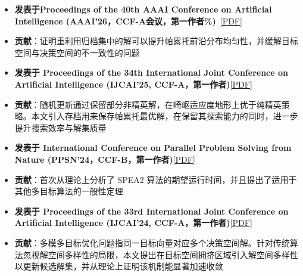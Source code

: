 \documentclass{resume}
\begin{document}
\begin{itemize}
    \item {\textbf{发表于Proceedings of the 40th AAAI Conference on Artificial Intelligence (AAAI'26，CCF-A会议，第一作者\%)}\ \href{https://ojs.aaai.org/index.php/AAAI/article/view/41045}{[PDF]}}
    \item {\textbf{贡献}}：证明重利用归档集中的解可以提升帕累托前沿分布均匀性，并缓解目标空间与决策空间的不一致性的问题
\end{itemize}
\begin{itemize}
    \item {\textbf{发表于 Proceedings of the 34th International Joint Conference on Artificial Intelligence (IJCAI'25, CCF-A，第一作者)}}\href{https://www.ijcai.org/proceedings/2025/0992.pdf}{[PDF]}
    \item {\textbf{贡献}：随机更新通过保留部分非精英解，在崎岖适应度地形上优于纯精英策略。本文引入存档用来保存帕累托最优解，在保留其探索能力的同时，进一步提升搜索效率与解集质量} 
\end{itemize}
\begin{itemize}
    \item {\textbf{发表于 International Conference on Parallel Problem Solving from Nature (PPSN'24，CCF-B，第一作者)}}\href{https://link.springer.com/chapter/10.1007/978-3-031-70071-2_19}{[PDF]}
    \item {\textbf{贡献}：首次从理论上分析了 SPEA2 算法的期望运行时间，并且提出了适用于其他多目标算法的一般性定理} 
\end{itemize}
\begin{itemize}
    \item {\textbf{发表于 Proceedings of the 33rd International Joint Conference on Artificial Intelligence (IJCAI'24, CCF-A，第一作者)}}\href{https://www.ijcai.org/proceedings/2024/0775.pdf}{[PDF]}
    \item {\textbf{贡献}：多模多目标优化问题指同一目标向量对应多个决策空间解。针对传统算法忽视解空间多样性的局限，本文提出在目标空间拥挤区域引入解空间多样性以更新候选解集，并从理论上证明该机制能显著加速收敛} 
\end{itemize}
\end{document}
